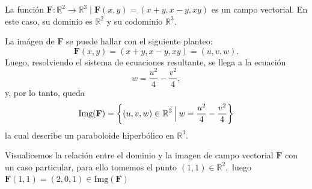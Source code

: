        \begin{example}  \label{ej:campoVectorial}
        La función $\mathbf{F}:\mathbb{R}^2 \rightarrow \mathbb{R}^3 \;|\; \mathbf{F}(x,y) = (x+y,x-y,xy)$ es un campo vectorial. 
        En este caso, su dominio es $\mathbb{R}^2 $ y su codominio $\mathbb{R}^3 $.
        
      La imágen de $\mathbf{F}$ se puede hallar con el siguiente planteo:
        \begin{equation*}
          \mathbf{F}(x,y) = (x+y,x-y,xy) = (u,v,w)  .
        \end{equation*}
        Luego, resolviendo el sistema de ecuaciones resultante, se llega a la ecuación
        \begin{equation*}
          w = \frac{u^2}{4}-\frac{v^2}{4},
        \end{equation*} y, por lo tanto, queda 
         \begin{equation}\label{imagF}
          \text{Img}(\mathbf{F})=\left\{ (u,v,w)\in\mathbb{R}^3 \:\Big|\: w=\frac{u^2}{4}-\frac{v^2}{4} \right\}
        \end{equation}  la cual describe  un paraboloide hiperbólico en $\mathbb{R}^3.$ 
       
Visualicemos  la relaci\'on entre  el dominio y la imagen de campo vectorial $\mathbf{F}$ con un caso particular, para ello tomemos el punto $(1,1) \in \mathbb{R}^{2},$  luego $ \mathbf{F}(1,1)=(2,0,1) \in  \text{Img}(\mathbf{F})$
 
 \begin{figure}[H]
  \begin{center}
\end{center}
\end{figure}
\end{example}
